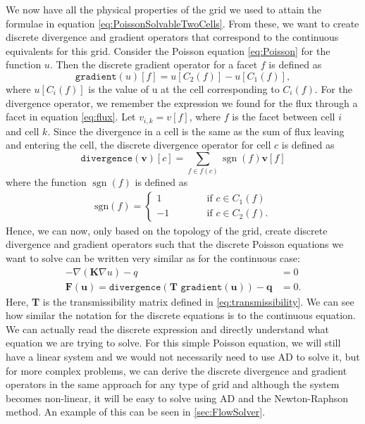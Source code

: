 We now have all the physical properties of the grid we used to attain the formulae in equation \eqref{eq:PoissonSolvableTwoCells}. From these, we want to create discrete divergence and gradient operators that correspond to the continuous equivalents for this grid. Consider the Poisson equation \eqref{eq:Poisson} for the function $u$. Then the discrete gradient operator for a facet $f$ is defined as 
\begin{equation}
    \texttt{gradient}(u)[f] = u[C_2(f)] - u[C_1(f)], 
    \label{eq:discreteGradient}
\end{equation}
where $u[C_i(f)]$ is the value of u at the cell corresponding to $C_i(f)$. For the divergence operator, we remember the expression we found for the flux through a facet in equation \eqref{eq:flux}. Let $v_{i,k} = v[f]$, where $f$ is the facet between cell $i$ and cell $k$. Since the divergence in a cell is the same as the sum of flux leaving and entering the cell, the discrete divergence operator for cell $c$ is defined as 
\begin{equation*}
    \texttt{divergence}(\textbf{v})[c] = \sum_{f\in f(c)} \operatorname{sgn}(f)\textbf{v}[f]
\end{equation*}
where the function $\operatorname{sgn}(f)$ is defined as 
\begin{align*}
    \text{sgn}(f) = \left\lbrace
    \begin{array}{rl}
        1 \hspace{3em}&\text{if } c \in C_1(f)\\
        -1 \hspace{3em}&\text{if } c \in C_2(f).
    \end{array}
    \right.
\end{align*}
Hence, we can now, only based on the topology of the grid, create discrete divergence and gradient operators such that the discrete Poisson equations we want to solve can be written very similar as for the continuous case:
\begin{align*}
    -\nabla(\textbf{K}\nabla u) - q &= 0 \\
    \textbf{F}(\textbf{u}) = \texttt{divergence}(\textbf{T }\texttt{gradient}(\textbf{u}))-\textbf{q} &= 0.
\end{align*}
Here, \textbf{T} is the transmissibility matrix defined in \eqref{eq:transmissibility}. We can see how similar the notation for the discrete equations is to the continuous equation. We can actually read the discrete expression and directly understand what equation we are trying to solve. For this simple Poisson equation, we will still have a linear system and we would not necessarily need to use AD to solve it, but for more complex problems, we can derive the discrete divergence and gradient operators in the same approach for any type of grid and although the system becomes non-linear, it will be easy to solve using AD and the Newton-Raphson method. An example of this can be seen in \autoref{sec:FlowSolver}.

 




























